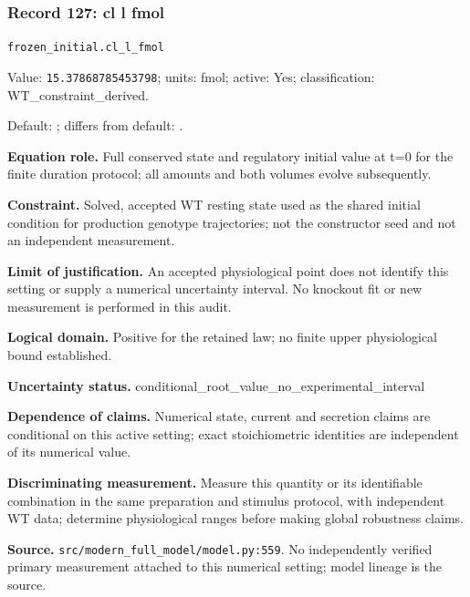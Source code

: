\subsubsection*{Record 127: cl l fmol}
{\small \nolinkurl{frozen_initial.cl_l_fmol}\par

Value: \texttt{15.37868785453798}; units: fmol; active: Yes; classification: WT\_constraint\_derived.\par

Default: ; differs from default: .\par

\textbf{Equation role.} Full conserved state and regulatory initial value at t=0 for the finite duration protocol; all amounts and both volumes evolve subsequently.\par

\textbf{Constraint.} Solved, accepted WT resting state used as the shared initial condition for production genotype trajectories; not the constructor seed and not an independent measurement.\par

\textbf{Limit of justification.} An accepted physiological point does not identify this setting or supply a numerical uncertainty interval. No knockout fit or new measurement is performed in this audit.\par

\textbf{Logical domain.} Positive for the retained law; no finite upper physiological bound established.\par

\textbf{Uncertainty status.} conditional\_root\_value\_no\_experimental\_interval\par

\textbf{Dependence of claims.} Numerical state, current and secretion claims are conditional on this active setting; exact stoichiometric identities are independent of its numerical value.\par

\textbf{Discriminating measurement.} Measure this quantity or its identifiable combination in the same preparation and stimulus protocol, with independent WT data; determine physiological ranges before making global robustness claims.\par

\textbf{Source.} \nolinkurl{src/modern_full_model/model.py:559}. No independently verified primary measurement attached to this numerical setting; model lineage is the source.\par}

